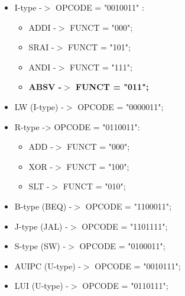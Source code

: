\begin{itemize}
	\item I-type -$>$ OPCODE = "0010011" :
	\begin{itemize}
		\item ADDI -$>$ FUNCT = "000";
		\item SRAI -$>$ FUNCT = "101";
		\item ANDI -$>$ FUNCT = "111";
		\item  \textbf{ABSV -$>$ FUNCT = "011";}
	\end{itemize}
	\item LW (I-type) -$>$ OPCODE = "0000011";
	\item R-type -> OPCODE = "0110011":
	\begin{itemize}
		\item ADD -$>$ FUNCT = "000";
		\item XOR -$>$ FUNCT = "100";
		\item SLT -$>$ FUNCT = "010";
	\end{itemize}
	\item B-type (BEQ) -$>$ OPCODE = "1100011";
	\item J-type (JAL) -$>$ OPCODE = "1101111";
	\item S-type (SW) -$>$ OPCODE = "0100011";
	\item AUIPC (U-type) -$>$ OPCODE = "0010111";
	\item LUI (U-type) -$>$ OPCODE = "0110111";		
\end{itemize}